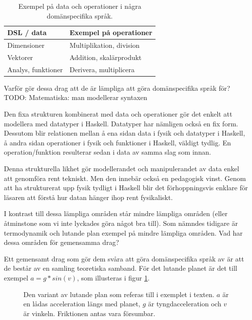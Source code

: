 \begin{binge}
\begin{table}[tph]
\centering
\caption{Exempel på data och operationer i några domänspecifika språk.}
\label{tab:data_och_ops}
\begin{tabular}{@{}l|l@{}}
\toprule
DSL / data & Exempel på operationer \\ \midrule
Dimensioner & Multiplikation, division \\
Vektorer & Addition, skalärprodukt \\
Analys, funktioner & Derivera, multiplicera \\ \bottomrule
\end{tabular}
\end{table}

Varför gör dessa drag att de är lämpliga att göra domänspecifika språk för? TODO: Matematiska: man modellerar syntaxen

Den fixa strukturen kombinerat med data och operationer gör det enkelt att modellera med datatyper i Haskell. Datatyper har nämligen också en fix form. Dessutom blir relationen mellan å ena sidan data i fysik och datatyper i Haskell, å andra sidan operationer i fysik och funktioner i Haskell, väldigt tydlig. En operation/funktion resulterar sedan i data av samma slag som innan.

Denna strukturella likhet gör modellerandet och manipulerandet av data enkel att genomföra rent tekniskt. Men den innebär också en pedagogisk vinst. Genom att ha strukturerat upp fysik tydligt i Haskell blir det förhoppningsvis enklare för läsaren att förstå hur datan hänger ihop rent fysikaliskt.

I kontrast till dessa lämpliga områden står mindre lämpliga områden (eller åtminstone som vi inte lyckades göra något bra till). Som nämndes tidigare är termodynamik och lutande plan exempel på mindre lämpliga områden. Vad har dessa områden för gemensamma drag?

Ett gemensamt drag som gör dem svåra att göra domänspecifika språk av är att de består av en samling teoretiska samband. För det lutande planet är det till exempel $a = g * sin(v)$, som illusteras i figur \ref{fig:lutande_plan}.

\begin{figure}[tph]
  \caption{Den variant av lutande plan som referas till i exemplet i texten. $a$ är en lådas acceleration längs med planet, $g$ är tyngdacceleration och $v$ är vinkeln. Friktionen antas vara försumbar.}
  \label{fig:lutande_plan}
\end{figure}


\end{binge}

